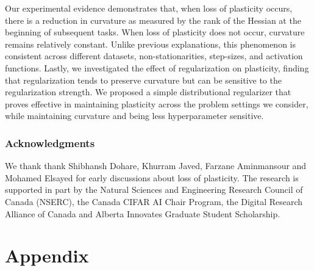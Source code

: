 \documentclass{article}
\begin{document}
Our experimental evidence demonstrates that, when loss of plasticity occurs, there is a reduction in curvature as measured by the rank of the Hessian at the beginning of subsequent tasks.
When loss of plasticity does not occur, curvature remains relatively constant.
Unlike previous explanations, this phenomenon is consistent across different datasets, non-stationarities, step-sizes, and activation functions.
Lastly, we investigated the effect of regularization on plasticity, finding that regularization tends to preserve curvature but can be sensitive to the regularization strength.
We proposed a simple distributional regularizer that proves effective in maintaining plasticity across the problem settings we consider, while maintaining curvature and being less hyperparameter sensitive.

\subsubsection*{Acknowledgments}
We thank thank Shibhansh Dohare, Khurram Javed, Farzane Aminmansour and Mohamed Elsayed for early discussions about loss of plasticity. The research is supported in part by the Natural Sciences and Engineering Research Council of Canada (NSERC), the Canada CIFAR AI Chair Program, the Digital Research Alliance of Canada and Alberta Innovates Graduate Student Scholarship.




\newpage
\appendix
\section*{Appendix}



\end{document}
